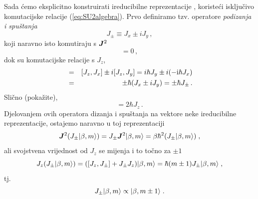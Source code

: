 Sada ćemo eksplicitno konstruirati ireducibilne reprezentacije , koristeći
isključivo komutacijske relacije (\ref{eq:SU2algebra}).
Prvo definiramo tzv. operatore \emph{podizanja i spuštanja}
\begin{equation}
    J_{\pm} \equiv J_x \pm i J_y \,, 
\end{equation}
koji naravno isto komutiraju s $\jsq$
\begin{equation}
    [\jsq, J_\pm] =0 \,,
\end{equation}
dok su komutacijske relacije s $J_z$, 
\begin{eqnarray*}
 [J_z, J_\pm]& = & [J_z, J_x] \pm i [J_z, J_y] = i\hbar J_y \pm i (-\rmi\hbar J_x)
 \\ & = & \pm \hbar (J_x \pm i J_y) = \pm \hbar J_\pm \,.
\end{eqnarray*}
Slično (pokažite),
\begin{displaymath}
 [J_+, J_-] = 2 \hbar J_z \,.
\end{displaymath}
Djelovanjem ovih operatora dizanja i spuštanja na vektore neke ireducibilne
reprezentacije, ostajemo naravno u toj reprezentaciji
\begin{displaymath}
   \jsq(J_{\pm}\ket{\beta, m})=J_{\pm}\jsq\ket{\beta, m}=\beta\hbar^2
    (J_{\pm}\ket{\beta, m}) \;,
\end{displaymath}
ali svojstvena vrijednost od $J_z$ se mijenja i to točno za $\pm 1$
\begin{equation}
J_z(J_{\pm}| \beta, m \rangle)=([J_z,J_{\pm}]+J_{\pm}J_z)| \beta, m \rangle=
\hbar(m\pm 1)J_{\pm}| \beta, m \rangle \;,
\label{jzjpm}
\end{equation}
tj.
\begin{equation}
    J_{\pm}| \beta, m \rangle\propto | \beta, m\pm 1 \rangle \;.
    \label{eq:jpmpropto}
\end{equation}


